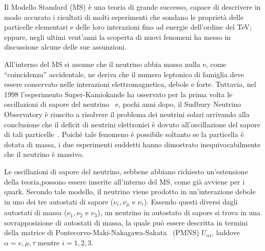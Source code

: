 Il Modello Standard (MS) è una teoria di grande successo, capace di descrivere in modo accurato i risultati di molti esperimenti che sondano le proprietà delle particelle elementari e delle loro interazioni fino ad energie dell'ordine del TeV; eppure, negli ultimi vent'anni la scoperta di nuovi fenomeni ha messo in discussione alcune delle sue assunzioni.

All'interno del MS si assume che il neutrino abbia massa nulla e, come ``coincidenza'' accidentale, ne deriva che il numero leptonico di famiglia deve essere conservato nelle interazioni elettromagnetica, debole e forte.
Tuttavia, nel 1998 l'esperimento Super-Kamiokande ha osservato per la prima volta le oscillazioni di sapore del neutrino~\cite{fukuda:prl98} e, pochi anni dopo, il Sudbury Neutrino Observatory è riuscito a risolvere il problema dei neutrini solari arrivando alla conclusione che il deficit di neutrini elettronici è dovuto all'oscillazione del sapore di tali particelle~\cite{ahmad:prl01}.
Poiché tale fenomeno è possibile soltanto se la particella è dotata di massa, i due esperimenti suddetti hanno dimostrato inequivocabilmente che il neutrino è massivo.

%
%
Le oscillazioni di sapore del neutrino, sebbene abbiano richiesto un'estensione della teoria,possono essere inserite all'interno del MS, come già avviene per i quark.
%
%
Secondo tale modello, il neutrino viene prodotto in un'interazione debole in uno dei tre autostati di sapore ($\nu_e, \nu_{\mu} \mbox{ e }  \nu_{\tau}$).
Essendo questi diversi dagli autostati di massa ($\nu_1, \nu_{2} \mbox{ e }  \nu_{3}$), un neutrino in autostato di sapore si trova in una sovrapposizione di autostati di massa,
la quale può essere descritta in termini della matrice di Pontecorvo-Maki-Nakagawa-Sakata~\cite{maki:ptp62} (PMNS) $U_{\alpha i}$, laddove $\alpha = e, \mu, \tau $ mentre $ i = 1, 2, 3 $.



